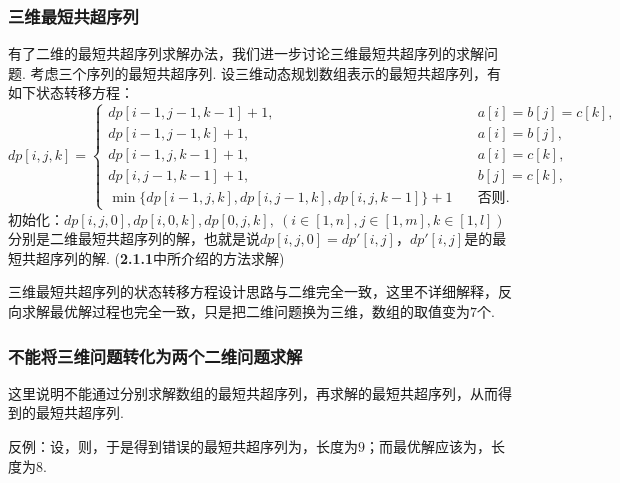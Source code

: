 \documentclass[12pt, a4paper, oneside]{ctexart}
\numberwithin{equation}{section}  %
\begin{document}
\subsubsection{三维最短共超序列}
有了二维的最短共超序列求解办法，我们进一步讨论三维最短共超序列的求解问题. 考虑三个序列的最短共超序列. 设三维动态规划数组表示的最短共超序列，有如下状态转移方程：
\begin{equation*}
    dp[i,j,k]=\begin{cases}
        dp[i-1,j-1,k-1]+1,&\quad a[i]=b[j]=c[k],\\
        dp[i-1,j-1,k]+1,&\quad a[i]=b[j],\\
        dp[i-1,j,k-1]+1,&\quad a[i]=c[k],\\
        dp[i,j-1,k-1]+1,&\quad b[j]=c[k],\\
        \min\bigg\{dp[i-1,j,k],dp[i,j-1,k],dp[i,j,k-1]\bigg\}+1&\quad \text{否则}.
    \end{cases}
\end{equation*}
初始化：$dp[i,j,0],dp[i,0,k],dp[0,j,k],\ (i\in[1,n], j\in[1,m], k\in[1,l])$分别是二维最短共超序列的解，也就是说$dp[i,j,0]= dp'[i,j]$，$dp'[i,j]$是的最短共超序列的解. (\textbf{2.1.1}中所介绍的方法求解)

三维最短共超序列的状态转移方程设计思路与二维完全一致，这里不详细解释，反向求解最优解过程也完全一致，只是把二维问题换为三维，数组的取值变为$7$个.

\subsubsection{不能将三维问题转化为两个二维问题求解}
这里说明不能通过分别求解数组的最短共超序列，再求解的最短共超序列，从而得到的最短共超序列.

反例：设，则，于是得到错误的最短共超序列为，长度为$9$；而最优解应该为，长度为$8$.
\end{document}
